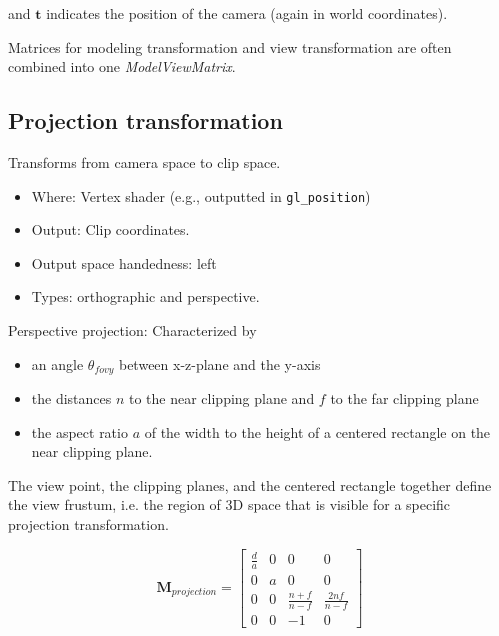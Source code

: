 \documentclass{scrartcl}
\begin{document}
        and $\mathbf{t}$ indicates the position of the camera (again in world coordinates).
        
        Matrices for modeling transformation and view transformation are often combined into one \textit{ModelViewMatrix}.
        
    \subsection{Projection transformation}
        
        Transforms from camera space to clip space. 
        
        \begin{itemize}
            \item Where: Vertex shader (e.g., outputted in \texttt{gl\_position})
            \item Output: Clip coordinates.
            \item Output space handedness: left
            \item Types: orthographic and perspective. 
        \end{itemize}    
                
        Perspective projection:
        Characterized by
        \begin{itemize}
            \item an angle $\theta_{fovy}$ between x-z-plane and the y-axis 
            \item the distances $n$ to the near clipping plane and $f$ to the far clipping plane 
            \item  the aspect ratio $a$ of the width to the height of a centered rectangle on the near clipping plane.            
        \end{itemize}     
        The view point, the clipping planes, and the centered rectangle together define the view frustum, i.e. the region of 3D space that is visible for a specific projection transformation.
         
        \[
        \mathbf{M}_{projection} =
        \begin{bmatrix}
            \frac{d}{a} & 0 & 0 & 0 \\
            0 & a & 0 & 0 \\
            0 & 0 & \frac{n+f}{n-f} & \frac{2nf}{n-f} \\
            0 & 0 & -1 & 0 
        \end{bmatrix}
        \]
        
\end{document}
